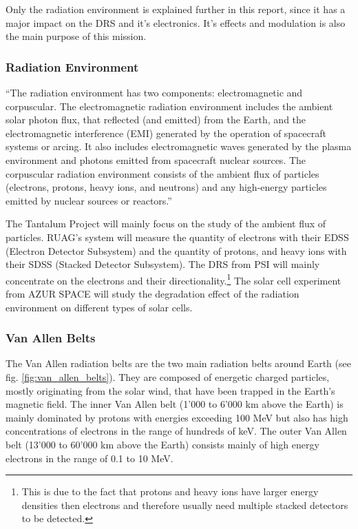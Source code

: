 Only the radiation environment is explained further in this report, since it has a major impact on the DRS and it's electronics.
It's effects and modulation is also the main purpose of this mission.

\subsubsection{Radiation Environment}
\label{sec:radiation_environment}
``The radiation environment has two components: electromagnetic and corpuscular. 
The electromagnetic radiation environment includes the ambient solar photon flux, that reflected (and emitted) from the Earth, and the electromagnetic interference (EMI) generated by the operation of spacecraft systems or arcing.
It also includes electromagnetic waves generated by the plasma environment and photons emitted from spacecraft nuclear sources.
The corpuscular radiation environment consists of the ambient flux of particles (electrons, protons, heavy ions, and neutrons) and any high-energy particles emitted by nuclear sources or reactors.''\cite{hastings2004spacecraft}

The Tantalum Project will mainly focus on the study of the ambient flux of particles.
RUAG's system will measure the quantity of electrons with their EDSS (Electron Detector Subsystem) and the quantity of protons, and heavy ions with their SDSS (Stacked Detector Subsystem).
The DRS from PSI will mainly concentrate on the electrons and their directionality.\footnote{This is due to the fact that protons and heavy ions have larger energy densities then electrons and therefore usually need multiple stacked detectors to be detected.}
The solar cell experiment from AZUR SPACE will study the degradation effect of the radiation environment on different types of solar cells.

\subsubsection{Van Allen Belts}
\label{sec:van_allen}
The Van Allen radiation belts are the two main radiation belts around Earth (see fig. \ref{fig:van_allen_belts}).
They are composed of energetic charged particles, mostly originating from the solar wind, that have been trapped in the Earth's magnetic field.
The inner Van Allen belt (1'000 to 6'000 km above the Earth) is mainly dominated by protons with energies exceeding 100 MeV but also has high concentrations of electrons in the range of hundreds of keV.
The outer Van Allen belt (13'000 to 60'000 km above the Earth) consists mainly of high energy electrons in the range of 0.1 to 10 MeV.\cite{wikipedia2016vanallen}

